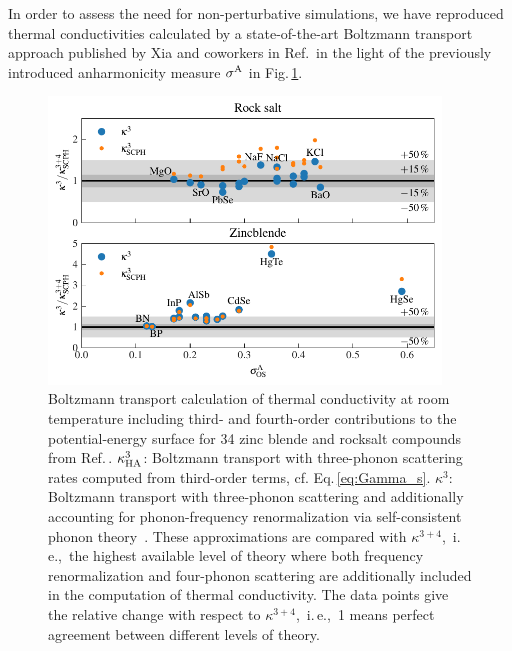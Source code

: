 In order to assess the need for non-perturbative simulations, 
we have reproduced thermal conductivities calculated by a state-of-the-art Boltzmann transport approach published by Xia and coworkers in Ref.\,\cite{Xia.2020} in the light of the previously introduced anharmonicity measure $\sigma^\mathrm{A}$ in Fig.\,\ref{fig:anh.bte}.
%
\begin{figure}
	\includegraphics[width=4.1in]{./data/plots/BTE_comparison/k_34.pdf}
	\caption{
		Boltzmann transport calculation of thermal conductivity at room temperature including third- and fourth-order contributions to the potential-energy surface for 34 zinc blende and rocksalt compounds from Ref.\,\cite{Xia.2020}. $\kappa^3_{\rm HA}$: Boltzmann transport with three-phonon scattering rates computed from third-order terms, cf. Eq.\,\eqref{eq:Gamma_s}. $\kappa^3$: Boltzmann transport with three-phonon scattering and additionally accounting for phonon-frequency renormalization via self-consistent phonon theory~\cite{Xia.2018}. These approximations are compared with $\kappa^{3+4}$,~i.\,e.,~the highest available level of theory where both frequency renormalization and four-phonon scattering are additionally included in the computation of thermal conductivity. The data points give the relative change with respect to $\kappa^{3+4}$,~i.\,e.,~1 means perfect agreement between different levels of theory.
	}
	\label{fig:anh.bte}
\end{figure}

